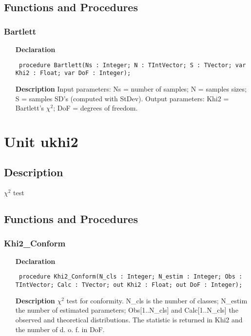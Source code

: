 \documentclass[12pt,a4paper,oneside]{report}
\newcommand{\declarationitem}[1]{\textbf{#1}}
\newcommand{\descriptiontitle}[1]{\textbf{#1}}
\newcommand{\code}[1]{\texttt{#1}}
\begin{document}
\subsection{Functions and Procedures}
\subsubsection{Bartlett}
\label{ubartlet-Bartlett}
\begin{itemize}\item[\declarationitem{Declaration}\hfill]
	\begin{flushleft}
		\code{
			procedure Bartlett(Ns : Integer; N : TIntVector; S : TVector; var Khi2 : Float; var DoF : Integer);}
	\end{flushleft}
	\item[\descriptiontitle{Description}]
	Input parameters: Ns = number of samples; N = samples sizes; S = samples SD's (computed with StDev). Output parameters: Khi2 = Bartlett's $\chi^2$; DoF = degrees of freedom.
\end{itemize}


\section{Unit ukhi2}
\label{ukhi2}
\subsection{Description}
$\chi^2$ test
\subsection{Functions and Procedures}
\subsubsection{Khi2{\_}Conform}
\label{ukhi2-Khi2_Conform}
\begin{itemize}\item[\declarationitem{Declaration}\hfill]
	\begin{flushleft}
		\code{
			procedure Khi2{\_}Conform(N{\_}cls : Integer; N{\_}estim : Integer; Obs : TIntVector; Calc : TVector; out Khi2 : Float; out DoF : Integer);}
	\end{flushleft}
	\item[\descriptiontitle{Description}]
	$\chi^2$ test for conformity. N{\_}cls is the number of classes; N{\_}estim the number of estimated parameters; Obs[1..N{\_}cls] and Calc[1..N{\_}cls] the observed and theoretical distributions. The statistic is returned in Khi2 and the number of d. o. f. in DoF.
\end{itemize}
\end{document}
